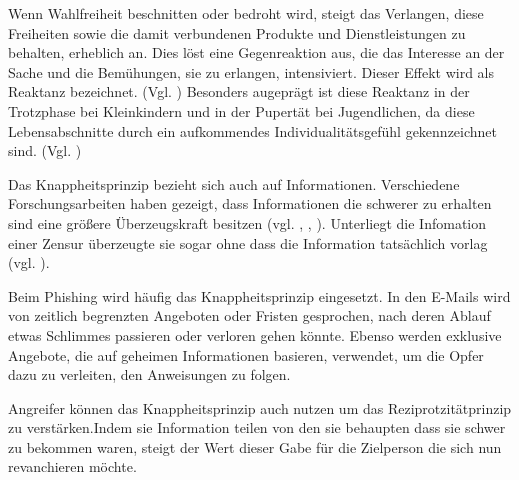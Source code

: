 Wenn Wahlfreiheit beschnitten oder bedroht wird, steigt das Verlangen, diese Freiheiten sowie die damit verbundenen Produkte und Dienstleistungen zu behalten, erheblich an. Dies löst eine Gegenreaktion aus, die das Interesse an der Sache und die Bemühungen, sie zu erlangen, intensiviert. Dieser Effekt wird als \glqq Reaktanz\grqq{} bezeichnet. (Vgl. \cite{Knapp3}) 
Besonders augeprägt ist diese Reaktanz in der Trotzphase bei Kleinkindern und in der Pupertät bei Jugendlichen, da diese Lebensabschnitte durch ein aufkommendes Individualitätsgefühl gekennzeichnet sind. (Vgl. \cite{PsychDesÜberzeugensKnapp}) 

Das Knappheitsprinzip bezieht sich auch auf Informationen. Verschiedene Forschungsarbeiten haben gezeigt, dass Informationen die schwerer zu erhalten sind eine größere Überzeugskraft besitzen (vgl. \cite{ForschKnapp}, \cite{Knapp4}, \cite{ForschKnapp1}). Unterliegt die Infomation einer Zensur überzeugte sie sogar ohne dass die Information tatsächlich vorlag (vgl. \cite{Knapp4}). 

Beim Phishing wird häufig das Knappheitsprinzip eingesetzt. In den E-Mails wird von zeitlich begrenzten Angeboten oder Fristen gesprochen, nach deren Ablauf etwas Schlimmes passieren oder verloren gehen könnte. Ebenso werden exklusive Angebote, die auf geheimen Informationen basieren, verwendet, um die Opfer dazu zu verleiten, den Anweisungen zu folgen.

Angreifer können das Knappheitsprinzip auch nutzen um das Reziprotzitätprinzip zu verstärken.Indem sie Information teilen von den sie behaupten dass sie schwer zu bekommen waren, steigt der Wert dieser Gabe für die Zielperson die sich nun revanchieren möchte.
